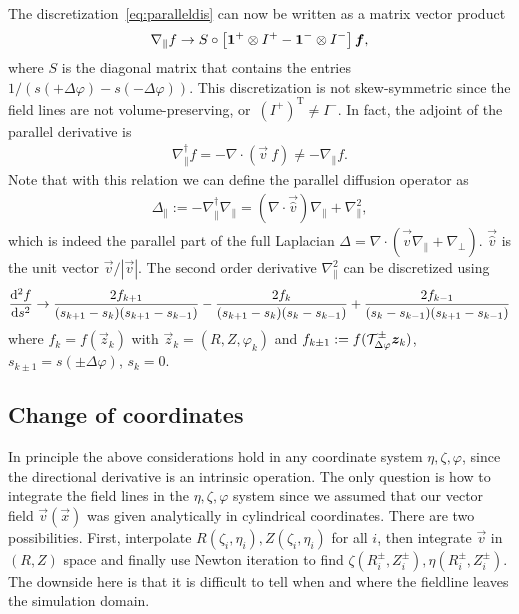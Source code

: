 The discretization~\eqref{eq:paralleldis} can now be written as a matrix vector product
\begin{align}
    \nabla_\parallel f \rightarrow S \circ \left[ \mathbf{1}^+\otimes I^+ - \mathbf{1}^- \otimes I^-  \right] {\boldsymbol{f}}, 
    \label{}
\end{align}
where $S$ is the diagonal matrix that contains the entries $1/(s(+\Delta\varphi) - s(-\Delta\varphi))$.
This discretization is not skew-symmetric since the
field lines are not volume-preserving, or~$(I^+)^\mathrm{T} \neq I^-$.
In fact, the adjoint of the parallel derivative is
\begin{align}
    \nabla_\parallel^\dagger f = - \nabla\cdot(\vec v\ f ) \neq -\nabla_\parallel f.
    \label{}
\end{align}
Note that with this relation we can define the parallel 
diffusion operator as
\begin{align}
    \Delta_\parallel := -\nabla_\parallel^\dagger \nabla_\parallel = (\nabla\cdot \vec{ \hat v}) \nabla_\parallel + \nabla_\parallel^2 , 
    \label{}
\end{align}
which is indeed the parallel part of the full Laplacian $\Delta = \nabla\cdot( \vec{ \hat v} \nabla_\parallel + \nabla_\perp)$.
$\vec{ \hat v} $ is the unit vector $\vec v/ |\vec v|$.
The second order derivative $\nabla_\parallel^2$ can be 
discretized using
\begin{align}
    \frac{\mathrm{d}^2 f}{\mathrm{d} s^2} \rightarrow
    \frac{2f_{k+1} }{(s_{k+1}-s_k)(s_{k+1}-s_{k-1})} -
    \frac{2f_k}{(s_{k+1}-s_k)(s_k - s_{k-1})} +
    \frac{2f_{k-1} }{(s_{k}-s_{k-1})(s_{k+1}-s_{k-1})}
    \label{}
\end{align}
where $f_k = f(\vec z_k)$ with $\vec z_k = (R,Z,\varphi_k)$ and $f_{k\pm 1} := f(\mathcal T^\pm_{\Delta\varphi} {\boldsymbol{z}}_k)$, $s_{k\pm 1} = s(\pm \Delta\varphi)$, $s_k = 0$.
\subsection{Change of coordinates}
In principle the above considerations hold in any
coordinate system $\eta,\zeta,\varphi$, since the directional derivative is 
an intrinsic operation.
The only question is how to integrate the field lines in the 
$\eta, \zeta,\varphi$ system 
since we assumed that our vector field $\vec v(\vec x)$ was given 
analytically in 
cylindrical coordinates. There are two possibilities. 
First, interpolate $R(\zeta_i, \eta_i), Z(\zeta_i, \eta_i)$ for 
all $i$, then integrate $\vec v$ in $(R,Z)$ space and finally use
Newton iteration to find $\zeta(R^\pm_i, Z^\pm_i), \eta(R^\pm_i, Z^\pm_i)$. 
The downside here is that it is difficult to tell when and where the fieldline leaves the simulation domain.

